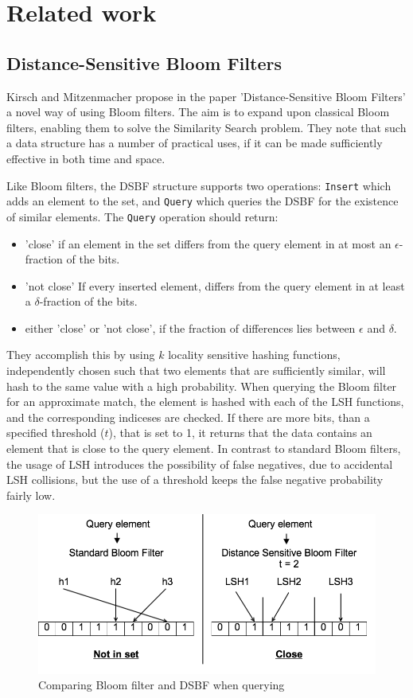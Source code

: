 \documentclass[a4paper,11pt]{article}
\begin{document}
\section{Related work}

\subsection{Distance-Sensitive Bloom Filters}
Kirsch and Mitzenmacher propose in the paper 'Distance-Sensitive Bloom Filters'\cite{paper:harvard} a novel way of using Bloom filters. The aim is to expand upon classical Bloom filters, enabling them to solve the Similarity Search problem. They note that such a data structure has a number of practical uses, if it can be made sufficiently effective in both time and space.

Like Bloom filters, the DSBF structure supports two operations:
\texttt{Insert} which adds an element to the set, and \texttt{Query} which queries the DSBF for the existence of similar elements.
The \texttt{Query} operation should return:
\begin{itemize}
\item 'close' if an element in the set differs from the query element in at most an $\epsilon$-fraction of the bits.
\item 'not close' If every inserted element, differs from the query element in at least a $\delta$-fraction of the bits.
\item either 'close' or 'not close', if the fraction of differences lies between $\epsilon$ and $\delta$.
\end{itemize}

They accomplish this by using $k$ locality sensitive hashing functions, independently chosen such that two elements that are sufficiently similar, will hash to the same value with a high probability.
When querying the Bloom filter for an approximate match, the element is hashed with each of the LSH functions, and the corresponding indiceses are checked. If there are more bits, than a specified threshold ($t$), that is set to 1, it returns that the data contains an element that is close to the query element. In contrast to standard Bloom filters, the usage of LSH introduces the possibility of false negatives, due to accidental LSH collisions, but the use of a threshold keeps the false negative probability fairly low.

\begin{figure}[H]
\centering
  \includegraphics[width=.95\linewidth]{sbf_vs_dsbf}
\caption{Comparing Bloom filter and DSBF when querying}
\label{fig:sbf-vs-dsbf}
\end{figure}
\end{document}
